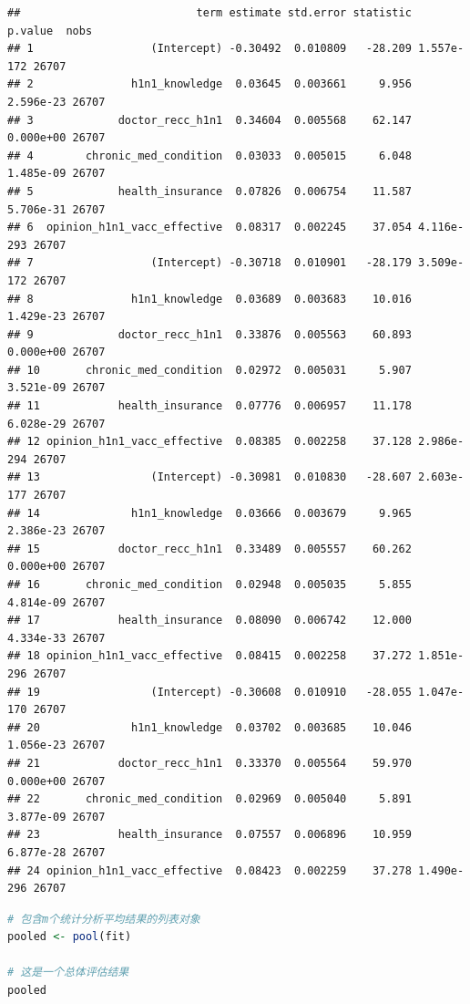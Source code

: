 \documentclass[]{ctexbook}
\begin{document}
\begin{lstlisting}
##                           term estimate std.error statistic    p.value  nobs
## 1                  (Intercept) -0.30492  0.010809   -28.209 1.557e-172 26707
## 2               h1n1_knowledge  0.03645  0.003661     9.956  2.596e-23 26707
## 3             doctor_recc_h1n1  0.34604  0.005568    62.147  0.000e+00 26707
## 4        chronic_med_condition  0.03033  0.005015     6.048  1.485e-09 26707
## 5             health_insurance  0.07826  0.006754    11.587  5.706e-31 26707
## 6  opinion_h1n1_vacc_effective  0.08317  0.002245    37.054 4.116e-293 26707
## 7                  (Intercept) -0.30718  0.010901   -28.179 3.509e-172 26707
## 8               h1n1_knowledge  0.03689  0.003683    10.016  1.429e-23 26707
## 9             doctor_recc_h1n1  0.33876  0.005563    60.893  0.000e+00 26707
## 10       chronic_med_condition  0.02972  0.005031     5.907  3.521e-09 26707
## 11            health_insurance  0.07776  0.006957    11.178  6.028e-29 26707
## 12 opinion_h1n1_vacc_effective  0.08385  0.002258    37.128 2.986e-294 26707
## 13                 (Intercept) -0.30981  0.010830   -28.607 2.603e-177 26707
## 14              h1n1_knowledge  0.03666  0.003679     9.965  2.386e-23 26707
## 15            doctor_recc_h1n1  0.33489  0.005557    60.262  0.000e+00 26707
## 16       chronic_med_condition  0.02948  0.005035     5.855  4.814e-09 26707
## 17            health_insurance  0.08090  0.006742    12.000  4.334e-33 26707
## 18 opinion_h1n1_vacc_effective  0.08415  0.002258    37.272 1.851e-296 26707
## 19                 (Intercept) -0.30608  0.010910   -28.055 1.047e-170 26707
## 20              h1n1_knowledge  0.03702  0.003685    10.046  1.056e-23 26707
## 21            doctor_recc_h1n1  0.33370  0.005564    59.970  0.000e+00 26707
## 22       chronic_med_condition  0.02969  0.005040     5.891  3.877e-09 26707
## 23            health_insurance  0.07557  0.006896    10.959  6.877e-28 26707
## 24 opinion_h1n1_vacc_effective  0.08423  0.002259    37.278 1.490e-296 26707
\end{lstlisting}

\begin{lstlisting}[language=R]
# 包含m个统计分析平均结果的列表对象
pooled <- pool(fit)

# 这是一个总体评估结果
pooled
\end{lstlisting}
\end{document}
